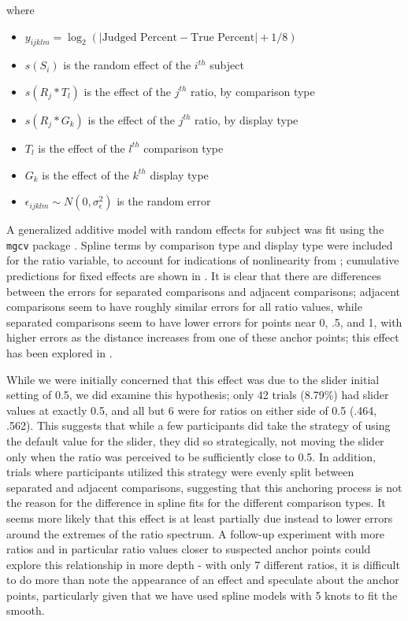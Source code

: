 \documentclass[letterpaper,inpress,dvipsnames]{jdsart}
\begin{document}
\noindent where

\begin{itemize}
\item
  \(y_{ijklm}=\log_2(|\text{Judged Percent} - \text{True Percent}|+1/8)\)
\item
  \(s(S_i)\) is the random effect of the \(i^{th}\) subject
\item
  \(s(R_j*T_l)\) is the effect of the \(j^{th}\) ratio, by comparison type
\item
  \(s(R_j*G_k)\) is the effect of the \(j^{th}\) ratio, by display type
\item
  \(T_l\) is the effect of the \(l^{th}\) comparison type
\item
  \(G_k\) is the effect of the \(k^{th}\) display type
\item
  \(\epsilon_{ijklm}\sim N(0,\sigma^2_\epsilon)\) is the random error
\end{itemize}

A generalized additive model with random effects for subject was fit using the \texttt{mgcv} package \citep{mgcv1, mgcv2, mgcv3}. Spline terms by comparison type and display type were included for the ratio variable, to account for indications of nonlinearity from ; cumulative predictions for fixed effects are shown in . It is clear that there are differences between the errors for separated comparisons and adjacent comparisons; adjacent comparisons seem to have roughly similar errors for all ratio values, while separated comparisons seem to have lower errors for points near 0, .5, and 1, with higher errors as the distance increases from one of these anchor points; this effect has been explored in \citet{hollandsBiasProportionJudgments2000}.

While we were initially concerned that this effect was due to the slider initial setting of 0.5, we did examine this hypothesis; only 42 trials (8.79\%) had slider values at exactly 0.5, and all but 6 were for ratios on either side of 0.5 (.464, .562). This suggests that while a few participants did take the strategy of using the default value for the slider, they did so strategically, not moving the slider only when the ratio was perceived to be sufficiently close to 0.5. In addition, trials where participants utilized this strategy were evenly split between separated and adjacent comparisons, suggesting that this anchoring process is not the reason for the difference in spline fits for the different comparison types. It seems more likely that this effect is at least partially due instead to lower errors around the extremes of the ratio spectrum. A follow-up experiment with more ratios and in particular ratio values closer to suspected anchor points could explore this relationship in more depth - with only 7 different ratios, it is difficult to do more than note the appearance of an effect and speculate about the anchor points, particularly given that we have used spline models with 5 knots to fit the smooth.
\end{document}
